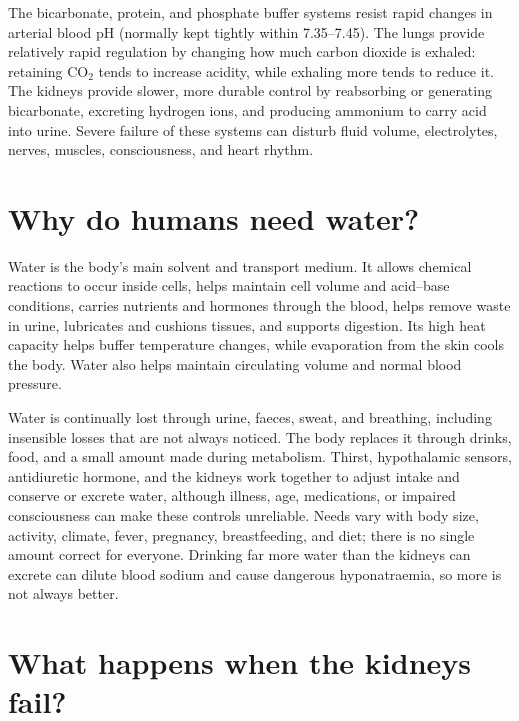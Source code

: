 \documentclass[11pt,oneside]{report}
\begin{document}
The bicarbonate, protein, and phosphate buffer systems resist rapid changes in
arterial blood pH (normally kept tightly within 7.35--7.45). The lungs provide relatively rapid regulation by changing how much
carbon dioxide is exhaled: retaining CO$_2$ tends to increase acidity, while
exhaling more tends to reduce it. The kidneys provide slower, more durable
control by reabsorbing or generating bicarbonate, excreting hydrogen ions, and
producing ammonium to carry acid into urine. Severe failure of these systems
can disturb fluid volume, electrolytes, nerves, muscles, consciousness, and
heart rhythm.

\section{Why do humans need water?}

Water is the body's main solvent and transport medium. It allows chemical
reactions to occur inside cells, helps maintain cell volume and acid--base
conditions, carries nutrients and hormones through the blood, helps remove
waste in urine, lubricates and cushions tissues, and supports digestion. Its
high heat capacity helps buffer temperature changes, while evaporation from
the skin cools the body. Water also helps maintain circulating volume and
normal blood pressure.

Water is continually lost through urine, faeces, sweat, and breathing, including
insensible losses that are not always noticed. The body replaces it through
drinks, food, and a small amount made during metabolism. Thirst, hypothalamic
sensors, antidiuretic hormone, and the kidneys work together to adjust intake
and conserve or excrete water, although illness, age, medications, or impaired
consciousness can make these controls unreliable. Needs vary with body size,
activity, climate, fever, pregnancy, breastfeeding, and diet; there is no
single amount correct for everyone. Drinking far more water than the kidneys
can excrete can dilute blood sodium and cause dangerous hyponatraemia, so more
is not always better.

\section{What happens when the kidneys fail?}
\end{document}
